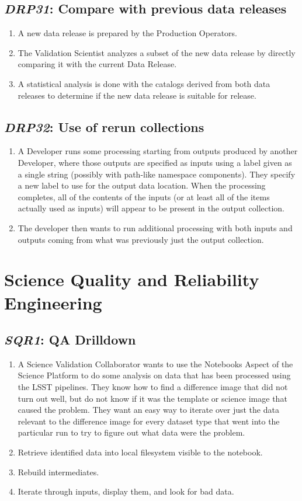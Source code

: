 \documentclass[DM,toc,lsstdraft]{lsstdoc}
\newcommand{\usecase}[3]{%
\subsection{\emph{#1}: #2}
\label{use:#1}
\begin{enumerate}[label=\alph*.]
#3
\end{enumerate}
}
\begin{document}
\usecase{DRP31}{Compare with previous data releases}{%

\item
A new data release is prepared by the Production Operators.

\item
The Validation Scientist analyzes a subset of the new data release by directly comparing it with the current Data Release.

\item
A statistical analysis is done with the catalogs derived from both data releases to determine if the new data release is suitable for release.

}

\usecase{DRP32}{Use of rerun collections}{%

\item
A Developer runs some processing starting from outputs produced by another Developer, where those outputs are specified as inputs using a label given as a single string (possibly with path-like namespace components).
They specify a new label to use for the output data location.
When the processing completes, all of the contents of the inputs (or at least all of the items actually used as inputs) will appear to be present in the output collection.

\item
The developer then wants to run additional processing with both inputs and outputs coming from what was previously just the output collection.

}

\section{Science Quality and Reliability Engineering}

\usecase{SQR1}{QA Drilldown}{%

\item
A Science Validation Collaborator wants to use the Notebooks Aspect of the Science Platform to do some analysis on data that has been processed using the LSST pipelines.
They know how to find a difference image that did not turn out well, but do not know if it was the template or science image that caused the problem.
They want an easy way to iterate over just the data relevant to the difference image for every dataset type that went into the particular run to try to figure out what data were the problem.

\item
Retrieve identified data into local filesystem visible to the notebook.

\item
Rebuild intermediates.

\item
Iterate through inputs, display them, and look for bad data.

}
\end{document}
